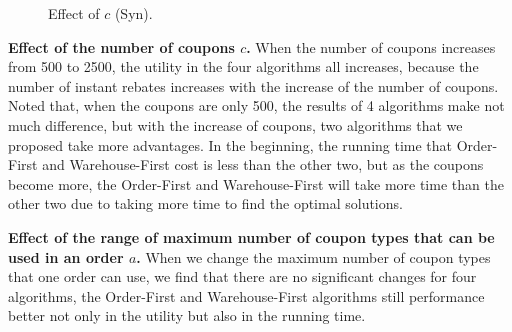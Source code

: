 
\iffalse

\begin{figure}[t!]\centering
	\subfigcapskip=-5pt
	\hfill\vspace{-2ex}
	\addtocounter{subfigure}{-1}
	\figureCaptionMargin
	\caption{\small Effect of $c$ (Syn).}\figureBelowMargin
	\label{fig:syn_10}
\end{figure}

\textbf{Effect of the number of coupons $c$.} When the number of coupons increases from 500 to 2500, the utility in the four algorithms all increases, because the number of instant rebates increases with the increase of the number of coupons. Noted that, when the coupons are only 500, the results of 4 algorithms make not much difference, but with the increase of coupons, two algorithms that we proposed take more advantages. In the beginning, the running time that Order-First and Warehouse-First cost is less than the other two, but as the coupons become more, the Order-First and Warehouse-First will take more time than the other two due to taking more time to find the optimal solutions.

\textbf{Effect of the range of maximum number of coupon types that can be used in an order $a$.} When we change the maximum number of coupon types that one order can use, we find that there are no significant changes for four algorithms, the Order-First and Warehouse-First  algorithms still performance better not only in the utility but also in the running time.


